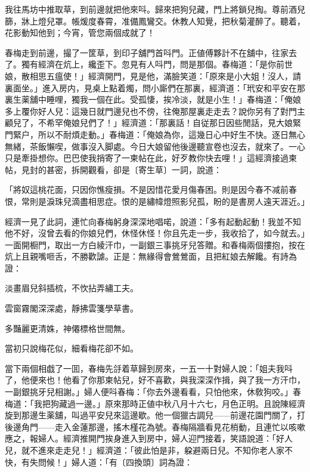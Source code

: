 \begin{myquote}
我往馬坊中推取草，到前邊就把他來呌。歸來把狗兒藏，門上將鎖兒掏。尊前酒兒篩，牀上燈兒罩。帳煖度春霄，准備鳳鸞交。休教人知覺，把秋菊灌醉了。聽着，花影動知他到；今宵，管您兩個成就了！
\end{myquote}

春梅走到前邊，撮了一筐草，到印子舖門首呌門。正値傅夥計不在舖中，往家去了。獨有經濟在炕上，纔歪下。忽見有人呌門，問是那個。春梅道：「是你前世娘，散相思五瘟使！」經濟開門，見是他，滿臉笑道：「原來是小大姐！沒人，請裏面坐。」進入房内，見桌上點着燭，問小廝們在那裏，經濟道：「玳安和平安在那裏生薬舖中睡哩，獨我一個在此。受孤悽，挨冷淡，就是小生！」春梅道：「俺娘多上覆你好人兒：這幾日就門邊兒也不傍，往俺那屋裏走走去？說你另有了對門主顧兒了，不希罕俺娘兒們了！」經濟道：「那裏話！自従那日因些閒話，見大娘緊門緊户，所以不耐煩走動。」春梅道：「俺娘為你，這幾日心中好生不快。逐日無心無緒，茶飯懶喫，做事沒入脚處。今日大娘留他後邊聽宣卷也沒去，就來了。一心只是牽掛想你。巴巴使我捎寄了一柬帖在此，好歹教你快去哩！」這經濟接過柬帖，見封的甚密，拆開觀看，卻是〔寄生草〕一詞，說道：

\begin{myquote}
「將奴這桃花面，只因你憔瘦損。不是因惜花愛月傷春困。則是因今春不减前春恨，常則是淚珠兒滴盡相思症。恨的是繡幃燈照影兒孤，盼的是書房人遠天涯近。」
\end{myquote}

經濟一見了此詞，連忙向春梅躬身深深地唱喏，說道：「多有起動起動！我並不知他不好，沒曾去看的你娘兒們，休怪休怪！你且先走一步，我收拾了，如今就去。」一面開橱門，取出一方白綾汗巾，一副銀三事挑牙兒答贈。和春梅兩個摟抱，按在炕上且親嘴咂舌，不勝歡謔。正是：無緣得會鶯鶯面，且把紅娘去解饞。有詩為證：

\begin{myquote}
淡畫眉兒斜插梳，不忺拈弄繡工夫。

雲窗霧閣深深處，靜拂雲箋學草書。

多豔麗更清姝，神僊標格世間無。

當初只說梅花似，細看梅花卻不如。
\end{myquote}

當下兩個相戯了一囬，春梅先㧱着草歸到房來，一五一十對婦人說：「姐夫我呌了，他便來也！他看了你那柬帖兒，好不喜歡，與我深深作揖，與了我一方汗巾，一副銀挑牙兒相謝。」婦人便呌春梅：「你去外邊看看，只怕他來，休敎狗咬。」春梅道：「我把狗藏過一邊。」原來那時正値中秋八月十六七，月色正明。且說陳經濟旋到那邊生薬舖，叫過平安兒來這邊歇。他一個獵古調兒——前邊花園門關了，打後邊角門——走入金蓮那邊，搖木槿花為號。春梅隔牆看見花梢動，且連忙以咳嗽應之，報婦人。經濟推開門挨身進入到房中，婦人迎門接着，笑語說道：「好人兒，就不進來走走兒！」經濟道：「彼此怕是非，躱避兩日兒。不知你老人家不快，有失問候！」婦人道：「有〔四換頭〕詞為證：

